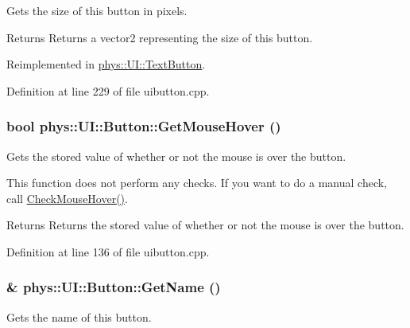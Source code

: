 Gets the size of this button in pixels. 

\begin{DoxyReturn}{Returns}
Returns a vector2 representing the size of this button. 
\end{DoxyReturn}


Reimplemented in \hyperlink{classphys_1_1UI_1_1TextButton_a062b31c199f875d4f825f6be1d11fb55}{phys::UI::TextButton}.



Definition at line 229 of file uibutton.cpp.

\hypertarget{classphys_1_1UI_1_1Button_a66522ebf5f3c75e96a6dfd99700a0f74}{
\subsubsection[{GetMouseHover}]{\setlength{\rightskip}{0pt plus 5cm}bool phys::UI::Button::GetMouseHover ()}}
\label{d8/d88/classphys_1_1UI_1_1Button_a66522ebf5f3c75e96a6dfd99700a0f74}


Gets the stored value of whether or not the mouse is over the button. 

This function does not perform any checks. If you want to do a manual check, call \hyperlink{classphys_1_1UI_1_1Button_a72d76501d15053e3fbd9e7eb933e22de}{CheckMouseHover()}. \begin{DoxyReturn}{Returns}
Returns the stored value of whether or not the mouse is over the button. 
\end{DoxyReturn}


Definition at line 136 of file uibutton.cpp.

\hypertarget{classphys_1_1UI_1_1Button_a1b757862cd1f4935d62c05ef4596b8a0}{
\subsubsection[{GetName}]{ \& phys::UI::Button::GetName ()}}
\label{d8/d88/classphys_1_1UI_1_1Button_a1b757862cd1f4935d62c05ef4596b8a0}


Gets the name of this button. 

